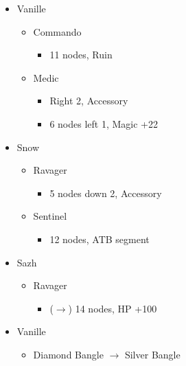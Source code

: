 \begin{menu}
	\begin{itemize}
		\crystarium
		\begin{itemize}
			\item Vanille
			      \begin{itemize}
				      \item Commando
				            \begin{itemize}
					            \item 11 nodes, Ruin
				            \end{itemize}
				      \item Medic
				            \begin{itemize}
					            \item Right 2, Accessory
					            \item 6 nodes left 1, Magic +22
				            \end{itemize}
			      \end{itemize}
			\item Snow
			      \begin{itemize}
				      \item Ravager
				            \begin{itemize}
					            \item 5 nodes down 2, Accessory
				            \end{itemize}
				      \item Sentinel
				            \begin{itemize}
					            \item 12 nodes, ATB segment
				            \end{itemize}
			      \end{itemize}
			\item Sazh
			      \begin{itemize}
				      \item Ravager
				            \begin{itemize}
					            \item ($\rightarrow$) 14 nodes,  HP +100
				            \end{itemize}
			      \end{itemize}
		\end{itemize}
		\equip
		\begin{itemize}
			\item Vanille
			      \begin{itemize}
				      \item Diamond Bangle $\rightarrow$ Silver Bangle

\end{itemize}
\end{itemize}
\end{itemize}
\end{menu}
